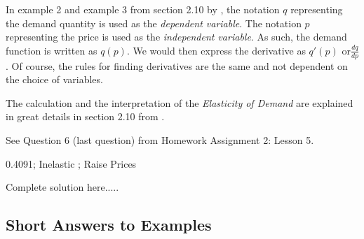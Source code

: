 In example 2 and example 3 from section 2.10 by \cite{Calaway}, the notation $q$ representing the demand quantity is used as the \emph{dependent variable}.  The notation $p$ representing the price is used as the \emph{independent variable}. As such, the demand function is written as $q(p)$.  We would then express the derivative as $q'(p)$ or\footnotemark[1] $\displaystyle\frac{dq}{dp}$.  Of course, the rules for finding derivatives are the same and not dependent on the choice of variables.

The calculation and the interpretation of the \emph{Elasticity of Demand} are explained in great details in section 2.10  from \cite{Calaway}\footnotemark[2].

\begin{example}
See Question 6 (last question) from Homework Assignment 2: Lesson 5.

    \begin{sol}
    0.4091; Inelastic ; Raise Prices
    \end{sol}
    \begin{solL}
    Complete solution here.....
    
    \end{solL}
    
\end{example}




\vspace*{\fill}
\subsection*{Short Answers to Examples}
\begin{multicols}{2}

\end{multicols}


